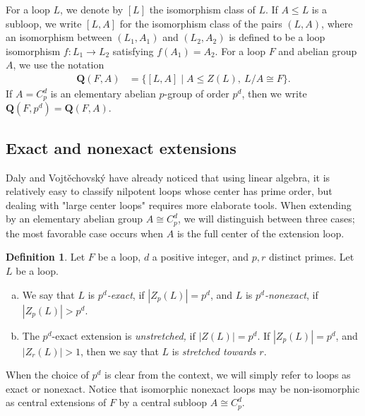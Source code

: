 \documentclass[12pt,a4paper]{amsart}
\theoremstyle{definition}
\newtheorem{definition}[theorem]{Definition}
\newcommand{\boldQ}{\mathbf{Q}}
\begin{document}
For a loop $L$, we denote by $[L]$ the isomorphism class of $L$. If $A \leq L$ is a subloop, we write $[L,A]$ for the isomorphism class of the pairs $(L,A)$, where an isomorphism between $(L_1,A_1)$ and $(L_2,A_2)$ is defined to be a loop isomorphism $f : L_1 \to L_2$ satisfying $f(A_1) = A_2$. For a loop $F$ and abelian group $A$, we use the notation
\begin{align} \label{eq:Qbold}
\boldQ(F,A) &= \bigl\{[L,A]\mid A \leq Z(L),\ L/A \cong F\bigr\}.
\end{align}
If $A=C_p^d$ is an elementary abelian $p$-group of order $p^d$, then we write $\boldQ(F,p^d) = \boldQ(F,A)$.

\subsection{Exact and nonexact extensions}
Daly and Vojt\v{e}chovsk\'y \cite{DalyVojtechovsky2009} have already noticed that using linear algebra, it is relatively easy to classify nilpotent loops whose center has prime order, but dealing with "large center loops" requires more elaborate tools. When extending by an elementary abelian group $A\cong C_p^d$, we will distinguish between three cases; the most favorable case occurs when $A$ is the full center of the extension loop.

\begin{definition}\label{def:Q-exact}
Let $F$ be a loop, $d$ a positive integer, and $p,r$ distinct primes. Let $L$ be a loop.
\begin{enumerate}[(a)]
\item We say that $L$ is \textit{$p^d$-exact}, if $|Z_p(L)|=p^d$, and $L$ is \textit{$p^d$-nonexact}, if $|Z_p(L)|>p^d$. 
\item The $p^d$-exact extension is \textit{unstretched,} if $|Z(L)|=p^d$. If $|Z_p(L)|=p^d$, and $|Z_r(L)|>1$, then we say that $L$ is \textit{stretched towards $r$}.
\end{enumerate}

\end{definition}

When the choice of $p^d$ is clear from the context, we will simply refer to loops as exact or nonexact. Notice that isomorphic nonexact loops may be non-isomorphic as central extensions of $F$ by a central subloop $A\cong C_p^d$. 
\end{document}
